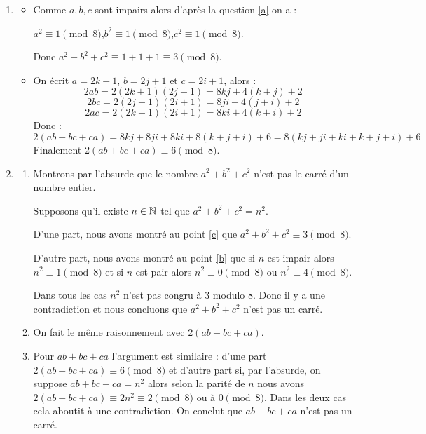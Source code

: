 \begin{enumerate}[label=\thechapter.\arabic*, font=\bfseries, itemsep=7mm,labelsep*=3mm,left=0mm]
\begin{enumerate}[label=\alph*),itemsep=7mm,left=-1mm,labelsep*=2mm]
\begin{itemize}
		\item Si $k$ est impair alors il existe $j\in \Z$ tel que $k=2j+1$ et $k^2=4j^2+4j+1$.
		
		Donc $n^2 = 4k^2=16(j^2+j)+4$ est divisible par 4 mais pas par 8.
		
		Finalement $n^2 \equiv 4 \pmod{8}$. 
	\end{itemize}
	
	\item\label{c} \begin{itemize}\setlength{\itemsep}{4mm}
		\item Comme $a, b, c$ sont impairs alors d'après la question \ref{a} on a :
		
		\medskip
		\centerline{$a^2 \equiv 1 \pmod{8}$\ehh,\ehh $b^2 \equiv 1 \pmod{8}$\ehh,\ehh$c^2 \equiv 1 \pmod{8}$.}
		
		\medskip
		Donc $a^2+b^2+c^2 \equiv 1+1+1 \equiv 3 \pmod{8}$.
		
		\item On écrit $a = 2k+1$, $b=2j+1$ et $c=2i+1$, alors :
		$$2ab = 2(2k+1)(2j+1) = 8kj + 4(k+j)+2$$
		$$2bc = 2(2j+1)(2i+1) = 8ji + 4(j+i)+2$$
		$$2ac = 2(2k+1)(2i+1) = 8ki + 4(k+i)+2$$
		Donc :
		$$2(ab+bc+ca)= 8kj+8ji+8ki + 8(k+j+i)+6= 8(kj+ji+ki+k+j+i)+6$$
		Finalement $2(ab+bc+ca) \equiv 6 \pmod{8}$.
	\end{itemize}
	
	\item \begin{enumerate}[label=\roman*)] 
		\item Montrons par l'absurde que le nombre $a^2+b^2+c^2$ n'est pas le carré d'un nombre entier.
		
		\smallskip
		Supposons qu'il existe $n\in \mathbb{N}$ tel que $a^2+b^2+c^2=n^2$. 
		
		\smallskip
		D'une part, nous avons montré au point \ref{c} que $a^2+b^2+c^2 \equiv 3 \pmod{8}$.
		
		\smallskip
		D'autre part, nous avons montré au point \ref{b} que si $n$ est impair alors $n^2 \equiv 1 \pmod{8}$ et si $n$ est pair alors
		$n^2 \equiv 0 \pmod{8}$ ou $n^2 \equiv 4 \pmod{8}$.
		
		\smallskip
		Dans tous les cas $n^2$ n'est pas congru à $3$ modulo $8$. Donc il y a une contradiction et nous concluons que $a^2+b^2+c^2$ n'est pas un carré.
		
		\item On fait le même raisonnement avec $2(ab+bc+ca)$.
		
		\item Pour $ab+bc+ca$ l'argument est similaire : 
		d'une part $2(ab+bc+ca)\equiv 6 \pmod{8}$
		et d'autre part si, par l'absurde, on suppose $ab+bc+ca=n^2$ alors
		selon la parit\'e de $n$ nous avons $2(ab+bc+ca)\equiv 2n^2 \equiv 2 \pmod{8}$
		ou \`a $0 \pmod{8}$. Dans les deux cas cela aboutit à une contradiction. On conclut que
		$ab+bc+ca$ n'est pas un carré.
	\end{enumerate}
\end{enumerate}


\end{enumerate}
